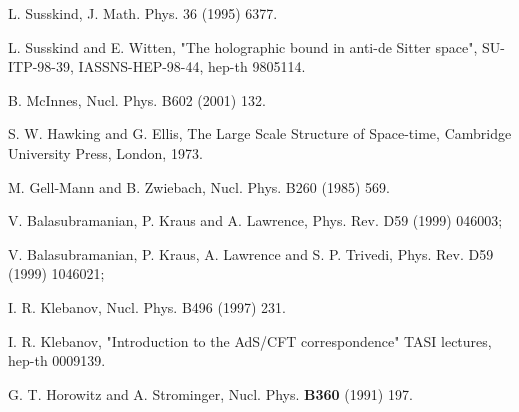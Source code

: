 \documentclass[a4paper,12pt]{article}
\begin{document}
\begin{thebibliography}{99}
 L. Susskind, J. Math. Phys. 36 (1995) 6377.

 L. Susskind and E. Witten, "The holographic bound in anti-de 
Sitter space", SU-ITP-98-39, IASSNS-HEP-98-44, hep-th 9805114.

 B. McInnes, Nucl. Phys. B602 (2001) 132.

 S. W. Hawking and G. Ellis, The Large Scale Structure of 
Space-time, Cambridge University Press, London, 1973.

 M. Gell-Mann and B. Zwiebach, Nucl. Phys. B260 (1985) 569.

 V. Balasubramanian, P. Kraus and A. Lawrence, 
Phys. Rev. D59 (1999) 046003;

V. Balasubramanian, P. Kraus, A. Lawrence and S. P. Trivedi, 
Phys. Rev. D59 (1999) 1046021;

 I. R. Klebanov, Nucl. Phys. B496 (1997) 231.

 I. R. Klebanov, "Introduction to the AdS/CFT correspondence"
TASI lectures, hep-th 0009139.

G. T. Horowitz and A. Strominger, Nucl. Phys. {\bf B360} (1991) 197.

\end{thebibliography}
\end{document}

